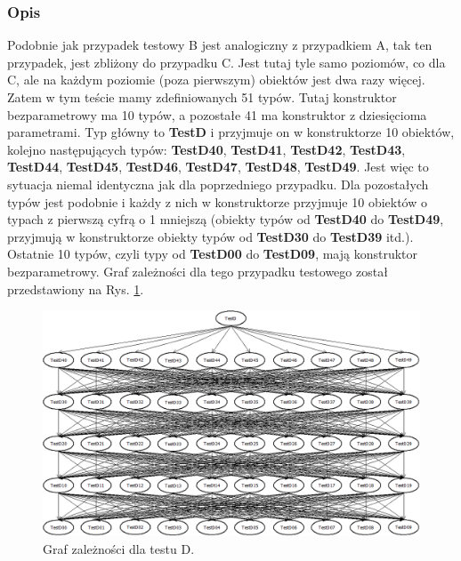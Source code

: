 \documentclass[12pt]{article}
\begin{document}
\subsubsection{Opis}
Podobnie jak przypadek testowy B jest analogiczny z przypadkiem A, tak ten przypadek, jest zbliżony do przypadku C. Jest tutaj tyle samo poziomów, co dla C, ale na każdym poziomie (poza pierwszym) obiektów jest dwa razy więcej. Zatem w tym teście mamy zdefiniowanych 51 typów. Tutaj konstruktor bezparametrowy ma 10 typów, a pozostałe 41 ma konstruktor z dziesięcioma parametrami. Typ główny to \textbf{TestD} i przyjmuje on w konstruktorze 10 obiektów, kolejno następujących typów: \textbf{TestD40}, \textbf{TestD41}, \textbf{TestD42}, \textbf{TestD43}, \textbf{TestD44}, \textbf{TestD45}, \textbf{TestD46}, \textbf{TestD47}, \textbf{TestD48}, \textbf{TestD49}. Jest więc to sytuacja niemal identyczna jak dla poprzedniego przypadku. Dla pozostałych typów jest podobnie i każdy z nich w konstruktorze przyjmuje 10 obiektów o typach z pierwszą cyfrą o 1 mniejszą (obiekty typów od \textbf{TestD40} do \textbf{TestD49}, przyjmują w konstruktorze obiekty typów od \textbf{TestD30} do \textbf{TestD39} itd.). Ostatnie 10 typów, czyli typy od \textbf{TestD00} do \textbf{TestD09}, mają konstruktor bezparametrowy. Graf zależności dla tego przypadku testowego został przedstawiony na Rys. \ref{fig:testD}.\\
\begin{figure}[H]
	\begin{center}
  		\includegraphics[width=\linewidth]{TestD.png}
  		\caption{Graf zależności dla testu D.}
  		\label{fig:testD}
	\end{center}
\end{figure}
\end{document}
